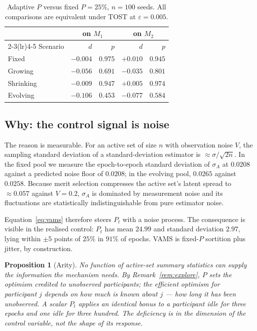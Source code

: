 \documentclass[10pt,twocolumn]{article}
\newtheorem{proposition}{Proposition}
\begin{document}
\begin{table}[t]\centering\small
\caption{Adaptive $P$ versus fixed $P=25\%$, $n=100$ seeds. All comparisons are
equivalent under TOST at $\varepsilon=0.005$.}
\label{tab:vams}
\begin{tabular}{lrrrr}
\toprule
& \multicolumn{2}{c}{on $M_1$} & \multicolumn{2}{c}{on $M_2$}\\
\cmidrule(lr){2-3}\cmidrule(lr){4-5}
Scenario & $d$ & $p$ & $d$ & $p$\\
\midrule
Fixed     & $-0.004$ & $0.975$ & $+0.010$ & $0.945$\\
Growing   & $-0.056$ & $0.691$ & $-0.035$ & $0.801$\\
Shrinking & $-0.009$ & $0.947$ & $+0.005$ & $0.974$\\
Evolving  & $-0.106$ & $0.453$ & $-0.077$ & $0.584$\\
\bottomrule
\end{tabular}
\end{table}

\subsection{Why: the control signal is noise}
The reason is measurable. For an active set of size $n$ with observation noise $V$, the
sampling standard deviation of a standard-deviation estimator is
$\approx\sigma/\sqrt{2n}$. In the fixed pool we measure the epoch-to-epoch standard
deviation of $\sigma_A$ at $0.0208$ against a predicted noise floor of $0.0208$; in the
evolving pool, $0.0265$ against $0.0258$. Because merit selection compresses the active
set's latent spread to $\approx0.057$ against $V=0.2$, $\sigma_A$ is dominated by
measurement noise and its fluctuations are statistically indistinguishable from pure
estimator noise.

Equation~\eqref{eq:vams} therefore steers $P_t$ with a noise process. The consequence
is visible in the realised control: $P_t$ has mean $24.99$ and standard deviation
$2.97$, lying within $\pm5$ points of $25\%$ in $91\%$ of epochs. VAMS is fixed-$P$
sortition plus jitter, by construction.

\begin{proposition}[Arity]\label{prop:arity}
No function of active-set summary statistics can supply the information the mechanism
needs. By Remark~\ref{rem:explore}, $P$ sets the optimism credited to unobserved
participants; the efficient optimism for participant $j$ depends on how much is known
about $j$ --- how long it has been unobserved. A scalar $P_t$ applies an identical
bonus to a participant idle for three epochs and one idle for three hundred. The
deficiency is in the dimension of the control variable, not the shape of its response.
\end{proposition}
\end{document}
